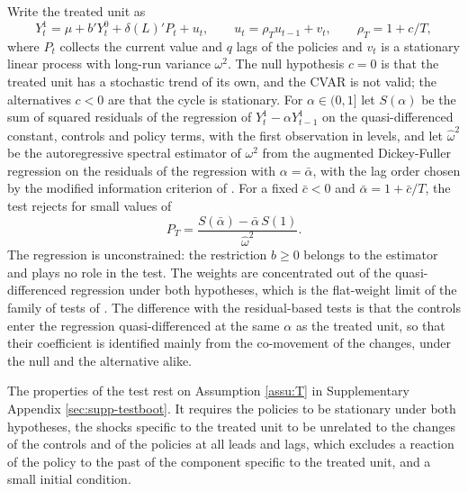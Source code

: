 \documentclass[12pt,a4paper]{article}
\theoremstyle{definition}
\theoremstyle{definition}\newtheorem{example}{Example}
\theoremstyle{definition}\newtheorem{definition}{Definition}
\begin{document}
Write the treated unit as
\begin{equation}
Y^1_t=\mu+b'Y^0_t+\delta(L)'P_t+u_t,\qquad u_t=\rho_Tu_{t-1}+v_t,\qquad \rho_T=1+c/T,
\label{eq:testmodel}
\end{equation}
where $P_t$ collects the current value and $q$ lags of the policies and $v_t$ is a stationary linear process with long-run variance $\omega^2$. The null hypothesis $c=0$ is that the treated unit has a stochastic trend of its own, and the CVAR is not valid; the alternatives $c<0$ are that the cycle is stationary. For $\alpha\in(0,1]$ let $S(\alpha)$ be the sum of squared residuals of the regression of $Y^1_t-\alpha Y^1_{t-1}$ on the quasi-differenced constant, controls and policy terms, with the first observation in levels, and let $\hat\omega^2$ be the autoregressive spectral estimator of $\omega^2$ from the augmented Dickey-Fuller regression on the residuals of the regression with $\alpha=\bar\alpha$, with the lag order chosen by the modified information criterion of \citet{NgPerron2001}. For a fixed $\bar c<0$ and $\bar\alpha=1+\bar c/T$, the test rejects for small values of
\begin{equation}
P_T=\frac{S(\bar\alpha)-\bar\alpha\,S(1)}{\hat\omega^2}.
\label{eq:PT}
\end{equation}
The regression is unconstrained: the restriction $b\geq0$ belongs to the estimator and plays no role in the test. The weights are concentrated out of the quasi-differenced regression under both hypotheses, which is the flat-weight limit of the family of tests of \citet{ElliottPesavento2009}. The difference with the residual-based tests is that the controls enter the regression quasi-differenced at the same $\alpha$ as the treated unit, so that their coefficient is identified mainly from the co-movement of the changes, under the null and the alternative alike.

The properties of the test rest on Assumption \ref{assu:T} in Supplementary Appendix \ref{sec:supp-testboot}. It requires the policies to be stationary under both hypotheses, the shocks specific to the treated unit to be unrelated to the changes of the controls and of the policies at all leads and lags, which excludes a reaction of the policy to the past of the component specific to the treated unit, and a small initial condition.
\end{document}
